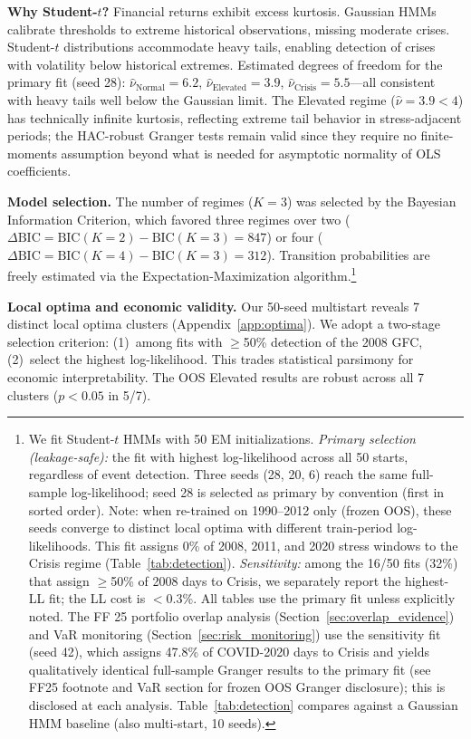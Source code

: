 \documentclass[sigconf,anonymous]{acmart}
\begin{document}
\textbf{Why Student-$t$?} Financial returns exhibit excess kurtosis. Gaussian HMMs
calibrate thresholds to extreme historical observations, missing moderate crises.
Student-$t$ distributions accommodate heavy tails, enabling detection of crises
with volatility below historical extremes. Estimated degrees of freedom for the
primary fit (seed 28): $\hat{\nu}_{\text{Normal}} = 6.2$, $\hat{\nu}_{\text{Elevated}} = 3.9$,
$\hat{\nu}_{\text{Crisis}} = 5.5$---all consistent with heavy tails well below
the Gaussian limit. The Elevated regime ($\hat\nu = 3.9 < 4$) has technically
infinite kurtosis, reflecting extreme tail behavior in stress-adjacent periods;
the HAC-robust Granger tests remain valid since they require no finite-moments
assumption beyond what is needed for asymptotic normality of OLS coefficients.

\textbf{Model selection.} The number of regimes ($K=3$) was selected by the Bayesian
Information Criterion, which favored three regimes over two
($\Delta\text{BIC} = \text{BIC}(K{=}2) - \text{BIC}(K{=}3) = 847$) or
four ($\Delta\text{BIC} = \text{BIC}(K{=}4) - \text{BIC}(K{=}3) = 312$). Transition probabilities are freely estimated via the Expectation-Maximization algorithm.\footnote{We fit Student-$t$ HMMs with 50
EM initializations.
\emph{Primary selection (leakage-safe):} the fit with highest log-likelihood across
all 50 starts, regardless of event detection. Three seeds (28, 20, 6) reach the same
full-sample log-likelihood; seed 28 is selected as primary by convention
(first in sorted order). Note: when re-trained on 1990--2012 only (frozen OOS),
these seeds converge to distinct local optima with different train-period log-likelihoods.
This fit assigns 0\% of 2008, 2011, and
2020 stress windows to the Crisis regime (Table~\ref{tab:detection}).
\emph{Sensitivity:} among the 16/50 fits (32\%) that assign $\geq$50\% of 2008
days to Crisis, we separately report the highest-LL fit; the LL cost is $<$0.3\%.
All tables use the primary fit unless explicitly noted.
The FF 25 portfolio overlap analysis (Section~\ref{sec:overlap_evidence}) and VaR
monitoring (Section~\ref{sec:risk_monitoring}) use the sensitivity fit (seed 42),
which assigns 47.8\% of COVID-2020 days to Crisis and yields qualitatively identical
full-sample Granger results to the primary fit (see FF25 footnote and VaR section
for frozen OOS Granger disclosure); this is disclosed at each analysis.
Table~\ref{tab:detection} compares against a Gaussian HMM baseline
(also multi-start, 10 seeds).}

\textbf{Local optima and economic validity.}
Our 50-seed multistart reveals 7 distinct local optima clusters (Appendix~\ref{app:optima}).
We adopt a two-stage selection criterion: (1)~among fits with $\geq$50\% detection
of the 2008 GFC, (2)~select the highest log-likelihood. This trades statistical
parsimony for economic interpretability. The OOS Elevated results are robust
across all 7 clusters ($p < 0.05$ in 5/7).
\end{document}
